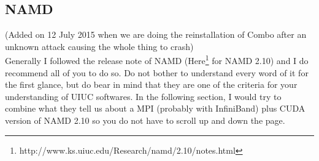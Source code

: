 \subsection{NAMD}
(Added on 12 July 2015 when we are doing the reinstallation of Combo after an unknown attack causing the whole thing to crash) \\
Generally I followed the release note of NAMD (Here\footnote{http://www.ks.uiuc.edu/Research/namd/2.10/notes.html} for NAMD 2.10) and I do recommend all of you to do so. Do not bother to understand every word of it for the first glance, but do bear in mind that they are one of the criteria for your understanding of UIUC softwares. In the following section, I would try to combine what they tell us about a MPI (probably with InfiniBand) plus CUDA version of NAMD 2.10 so you do not have to scroll up and down the page. 
